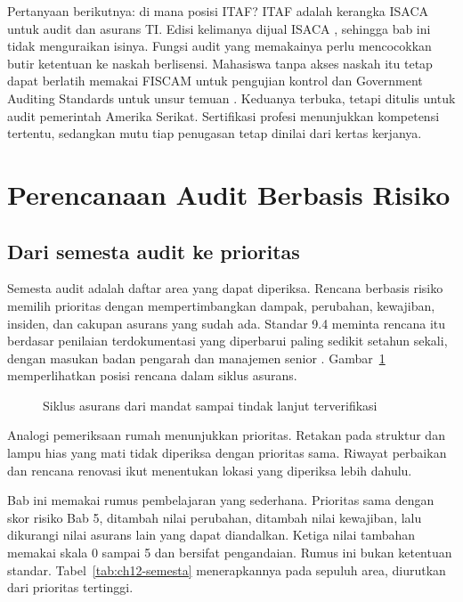 Pertanyaan berikutnya: di mana posisi ITAF? ITAF adalah kerangka ISACA untuk audit dan asurans TI.
Edisi kelimanya dijual ISACA \cite{c12-itaf}, sehingga bab ini tidak menguraikan isinya. Fungsi
audit yang memakainya perlu mencocokkan butir ketentuan ke naskah berlisensi. Mahasiswa tanpa
akses naskah itu tetap dapat berlatih memakai FISCAM untuk pengujian kontrol dan Government
Auditing Standards untuk unsur temuan \cite{c12-fiscam2026,c12-gagas2024}. Keduanya terbuka, tetapi
ditulis untuk audit pemerintah Amerika Serikat. Sertifikasi profesi menunjukkan kompetensi
tertentu, sedangkan mutu tiap penugasan tetap dinilai dari kertas kerjanya.

\section{Perencanaan Audit Berbasis Risiko}

\subsection*{Dari semesta audit ke prioritas}

Semesta audit adalah daftar area yang dapat diperiksa. Rencana berbasis risiko memilih prioritas
dengan mempertimbangkan dampak, perubahan, kewajiban, insiden, dan cakupan asurans yang sudah ada.
Standar 9.4 meminta rencana itu berdasar penilaian terdokumentasi yang diperbarui paling sedikit
setahun sekali, dengan masukan badan pengarah dan manajemen senior \cite{iia-gias2024}.
Gambar~\ref{fig:ch12-alur} memperlihatkan posisi rencana dalam siklus asurans.

\begin{figure}[!htb]
  \centering
  
  \caption{Siklus asurans dari mandat sampai tindak lanjut terverifikasi}
  \label{fig:ch12-alur}
\end{figure}

Analogi pemeriksaan rumah menunjukkan prioritas. Retakan pada struktur dan lampu hias yang mati
tidak diperiksa dengan prioritas sama. Riwayat perbaikan dan rencana renovasi ikut menentukan
lokasi yang diperiksa lebih dahulu.

Bab ini memakai rumus pembelajaran yang sederhana. Prioritas sama dengan skor risiko Bab 5,
ditambah nilai perubahan, ditambah nilai kewajiban, lalu dikurangi nilai asurans lain yang dapat
diandalkan. Ketiga nilai tambahan memakai skala 0 sampai 5 dan bersifat pengandaian. Rumus ini
bukan ketentuan standar. Tabel~\ref{tab:ch12-semesta} menerapkannya pada sepuluh area, diurutkan
dari prioritas tertinggi.

